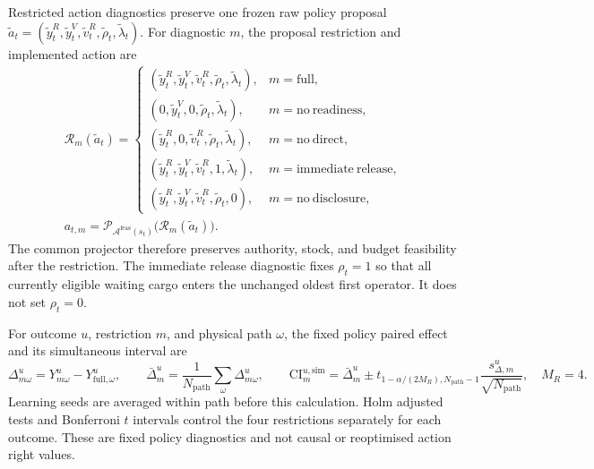 \documentclass[a4paper,fleqn]{cas-sc}
\begin{document}
Restricted action diagnostics preserve one frozen raw policy proposal
$\widetilde a_t=(\widetilde y_t^R,\widetilde y_t^V,
\widetilde v_t^R,\widetilde\rho_t,\widetilde\lambda_t)$. For diagnostic $m$,
the proposal restriction and implemented action are
\begin{equation}
 \begin{gathered}
 \mathcal R_m(\widetilde a_t)=
 \begin{cases}
 (\widetilde y_t^R,\widetilde y_t^V,\widetilde v_t^R,
  \widetilde\rho_t,\widetilde\lambda_t),&m=\mathrm{full},\\
 (0,\widetilde y_t^V,0,\widetilde\rho_t,
  \widetilde\lambda_t),&m=\mathrm{no\ readiness},\\
 (\widetilde y_t^R,0,\widetilde v_t^R,\widetilde\rho_t,
  \widetilde\lambda_t),&m=\mathrm{no\ direct},\\
 (\widetilde y_t^R,\widetilde y_t^V,\widetilde v_t^R,1,
  \widetilde\lambda_t),&m=\mathrm{immediate\ release},\\
 (\widetilde y_t^R,\widetilde y_t^V,\widetilde v_t^R,
  \widetilde\rho_t,0),&m=\mathrm{no\ disclosure},
 \end{cases}\\
 a_{t,m}=\mathcal P_{\mathcal A^{\mathrm{feas}}(s_t)}
 \bigl(\mathcal R_m(\widetilde a_t)\bigr).
 \end{gathered}
 \label{eq:mechanism-action-restrictions}
\end{equation}
The common projector therefore preserves authority, stock, and budget
feasibility after the restriction. The immediate release diagnostic fixes
$\rho_t=1$ so that all currently eligible waiting cargo enters the unchanged
oldest first operator. It does not set $\rho_t=0$.

For outcome $u$, restriction $m$, and physical path $\omega$, the fixed policy
paired effect and its simultaneous interval are
\begin{equation}
 \Delta^{u}_{m\omega}=Y^{u}_{m\omega}-Y^{u}_{\mathrm{full},\omega},
 \qquad
 \bar\Delta^{u}_{m}=\frac{1}{N_{\mathrm{path}}}
 \sum_{\omega}\Delta^{u}_{m\omega},
 \qquad
 \mathrm{CI}^{u,\mathrm{sim}}_{m}
 =\bar\Delta^{u}_{m}\pm
 t_{1-\alpha/(2M_R),N_{\mathrm{path}}-1}
 \frac{s^{u}_{\Delta,m}}{\sqrt{N_{\mathrm{path}}}},
 \quad M_R=4.
 \label{eq:mechanism-paired-diagnostic}
\end{equation}
Learning seeds are averaged within path before this calculation. Holm adjusted
tests and Bonferroni $t$ intervals control the four restrictions separately for
each outcome. These are fixed policy diagnostics and not causal or reoptimised
action right values.
\end{document}
